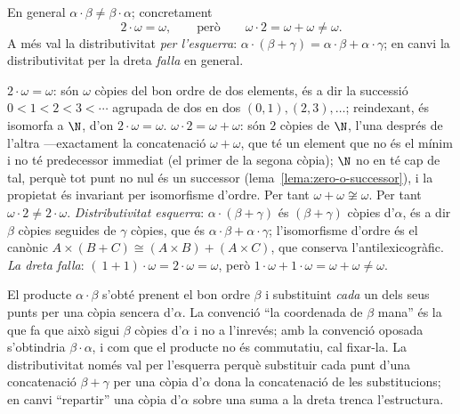 \begin{proposicio}\label{prop:producte-propietats}
En general \(\alpha\cdot\beta\neq\beta\cdot\alpha\); concretament
\[
2\cdot\omega=\omega,
\qquad\text{però}\qquad
\omega\cdot2=\omega+\omega\neq\omega .
\]
A més val la distributivitat \emph{per l'esquerra}:
\(\alpha\cdot(\beta+\gamma)=\alpha\cdot\beta+\alpha\cdot\gamma\); en canvi la
distributivitat per la dreta \emph{falla} en general.
\end{proposicio}

\begin{prova}
\emph{\(2\cdot\omega=\omega\)}: són \(\omega\) còpies del bon ordre de dos
elements, és a dir la successió \(0<1<2<3<\cdots\) agrupada de dos en dos
\((0,1),(2,3),\dots\); reindexant, és isomorfa a \(\N\), d'on
\(2\cdot\omega=\omega\). \emph{\(\omega\cdot2=\omega+\omega\)}: són \(2\)
còpies de \(\N\), l'una després de l'altra ---exactament la concatenació
\(\omega+\omega\), que té un element que no és el mínim i no té predecessor
immediat (el primer de la segona còpia); \(\N\) no en té cap de tal, perquè
tot punt no nul és un successor (lema~\ref{lema:zero-o-successor}), i la
propietat és invariant per isomorfisme d'ordre. Per tant
\(\omega+\omega\not\cong\omega\). Per
tant \(\omega\cdot2\neq2\cdot\omega\). \emph{Distributivitat esquerra}:
\(\alpha\cdot(\beta+\gamma)\) és \((\beta+\gamma)\) còpies d'\(\alpha\), és a
dir \(\beta\) còpies seguides de \(\gamma\) còpies, que és
\(\alpha\cdot\beta+\alpha\cdot\gamma\); l'isomorfisme d'ordre és el canònic
\(A\times(B+C)\cong(A\times B)+(A\times C)\), que conserva l'antilexicogràfic.
\emph{La dreta falla}: \((\ 1+1)\cdot\omega=2\cdot\omega=\omega\), però
\(1\cdot\omega+1\cdot\omega=\omega+\omega\neq\omega\).
\end{prova}

\begin{observacio}\label{obs:producte-classic}
El producte \(\alpha\cdot\beta\) s'obté prenent el bon ordre \(\beta\) i
substituint \emph{cada} un dels seus punts per una còpia sencera d'\(\alpha\).
La convenció \enquote{la coordenada de \(\beta\) mana} és la que fa que això
sigui \(\beta\) còpies d'\(\alpha\) i no a l'inrevés; amb la convenció
oposada s'obtindria \(\beta\cdot\alpha\), i com que el producte no és
commutatiu, cal fixar-la. La distributivitat només val per l'esquerra
perquè substituir cada punt d'una concatenació \(\beta+\gamma\) per una còpia
d'\(\alpha\) dona la concatenació de les substitucions; en canvi
\enquote{repartir} una còpia d'\(\alpha\) sobre una suma a la dreta trenca
l'estructura.
\end{observacio}

